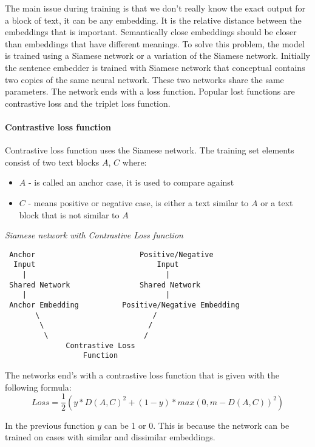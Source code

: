 \documentclass[11pt]{wseas}
\begin{document}
The main issue during training is that we don't really know the exact
output for a block of text, it can be any embedding. It is the relative
distance between the embeddings that is important. Semantically close
embeddings should be closer than embeddings that have different
meanings. To solve this problem, the model is trained using a Siamese
network or a variation of the Siamese network. Initially the sentence
embedder is trained with Siamese network that conceptual contains two
copies of the same neural network. These two networks share the same
parameters. The network ends with a loss function. Popular lost
functions are contrastive loss and the triplet loss function.

\paragraph{Contrastive loss function}\label{contrastive-loss-function}

Contrastive loss function uses the Siamese network. The training set
elements consist of two text blocks \(A\), \(C\) where:

\begin{itemize}
\tightlist
\item
  \(A\) - is called an anchor case, it is used to compare against
\item
  \(C\) - means positive or negative case, is either a text similar to
  \(A\) or a text block that is not similar to \(A\)
\end{itemize}

\emph{Siamese network with Contrastive Loss function}

\begin{verbatim}
 Anchor                        Positive/Negative
  Input                            Input
    |                                |
 Shared Network                Shared Network 
    |                                |
 Anchor Embedding          Positive/Negative Embedding
       \                          /
        \                        /
         \                      /
              Contrastive Loss
                  Function
\end{verbatim}

The networks end's with a contrastive loss function that is given with
the following formula: \[
Loss =  \frac{1}{2} (y*D(A,C)^2 + (1-y)*max(0,m-D(A,C))^2)
\]

In the previous function \(y\) can be 1 or 0. This is because the
network can be trained on cases with similar and dissimilar embeddings.
\end{document}
